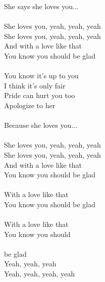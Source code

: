 \begin{multicols}{2}
She says she loves you...\\
\\
She loves you, yeah, yeah, yeah\\
She loves you, yeah, yeah, yeah\\
And with a love like that\\
You know you should be glad\\
\\
You know it's up to you\\
I think it's only fair\\
Pride can hurt you too\\
Apologize to her\\
\\
Because she loves you...\\
\columnbreak
\\
She loves you, yeah, yeah, yeah\\
She loves you, yeah, yeah, yeah\\
And with a love like that\\
You know you should be glad\\
\\
With a love like that\\
You know you should be glad\\
\\
With a love like that\\
You know you should\\
\\
be glad\\
Yeah, yeah, yeah\\
Yeah, yeah, yeah, yeah\\
\end{multicols}